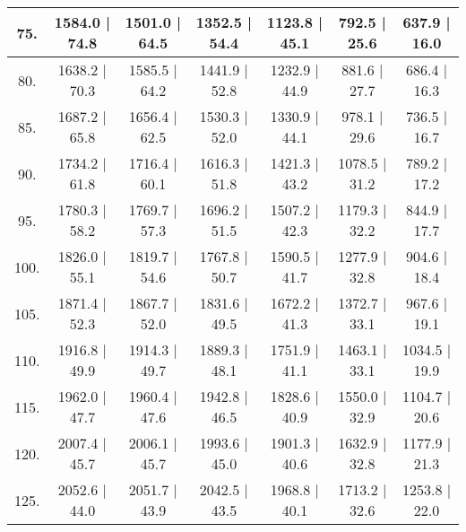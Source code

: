 \begin{tabular}{|c||c|c|c|c|c|c|}
\hline
  75. &   1584.0 |    74.8 &   1501.0 |    64.5 &   1352.5 |    54.4 &   1123.8 |    45.1 &    792.5 |    25.6 &    637.9 |    16.0\tabularnewline
\hline
  80. &   1638.2 |    70.3 &   1585.5 |    64.2 &   1441.9 |    52.8 &   1232.9 |    44.9 &    881.6 |    27.7 &    686.4 |    16.3\tabularnewline
\hline
  85. &   1687.2 |    65.8 &   1656.4 |    62.5 &   1530.3 |    52.0 &   1330.9 |    44.1 &    978.1 |    29.6 &    736.5 |    16.7\tabularnewline
\hline
  90. &   1734.2 |    61.8 &   1716.4 |    60.1 &   1616.3 |    51.8 &   1421.3 |    43.2 &   1078.5 |    31.2 &    789.2 |    17.2\tabularnewline
\hline
  95. &   1780.3 |    58.2 &   1769.7 |    57.3 &   1696.2 |    51.5 &   1507.2 |    42.3 &   1179.3 |    32.2 &    844.9 |    17.7\tabularnewline
\hline
 100. &   1826.0 |    55.1 &   1819.7 |    54.6 &   1767.8 |    50.7 &   1590.5 |    41.7 &   1277.9 |    32.8 &    904.6 |    18.4\tabularnewline
\hline
 105. &   1871.4 |    52.3 &   1867.7 |    52.0 &   1831.6 |    49.5 &   1672.2 |    41.3 &   1372.7 |    33.1 &    967.6 |    19.1\tabularnewline
\hline
 110. &   1916.8 |    49.9 &   1914.3 |    49.7 &   1889.3 |    48.1 &   1751.9 |    41.1 &   1463.1 |    33.1 &   1034.5 |    19.9\tabularnewline
\hline
 115. &   1962.0 |    47.7 &   1960.4 |    47.6 &   1942.8 |    46.5 &   1828.6 |    40.9 &   1550.0 |    32.9 &   1104.7 |    20.6\tabularnewline
\hline
 120. &   2007.4 |    45.7 &   2006.1 |    45.7 &   1993.6 |    45.0 &   1901.3 |    40.6 &   1632.9 |    32.8 &   1177.9 |    21.3\tabularnewline
\hline
 125. &   2052.6 |    44.0 &   2051.7 |    43.9 &   2042.5 |    43.5 &   1968.8 |    40.1 &   1713.2 |    32.6 &   1253.8 |    22.0\tabularnewline
\hline
\end{tabular}
